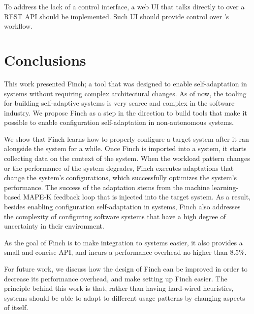 To address the lack of a control interface, a web UI that talks directly to \projectname{} over a REST API should be implemented. Such UI should provide control over \projectname{} 's workflow.


\section{Conclusions}
This work presented Finch; a tool that was designed to enable self-adaptation in systems without requiring complex architectural changes. As of now, the tooling for building self-adaptive systems is very scarce and complex in the software industry. We propose Finch as a step in the direction to build tools that make it possible to enable configuration self-adaptation in non-autonomous systems.

We show that Finch learns how to properly configure a target system after it ran alongside the system for a while. Once Finch is imported into a system, it starts collecting data on the context of the system. When the workload pattern changes or the performance of the system degrades, Finch executes adaptations that change the system’s configurations, which successfully optimizes the system's performance. The success of the adaptation stems from the machine learning-based MAPE-K feedback loop that is injected into the target system. As a result, besides enabling configuration self-adaptation in systems, Finch also addresses the complexity of configuring software systems that have a high degree of uncertainty in their environment.

As the goal of Finch is to make integration to systems easier, it also provides a small and concise API, and incurs a performance overhead no higher than 8.5\%. 

For future work, we discuss how the design of Finch can be improved in order to decrease its performance overhead, and make setting up Finch easier. The principle behind this work is that, rather than having hard-wired heuristics, systems should be able to adapt to different usage patterns by changing aspects of itself.



